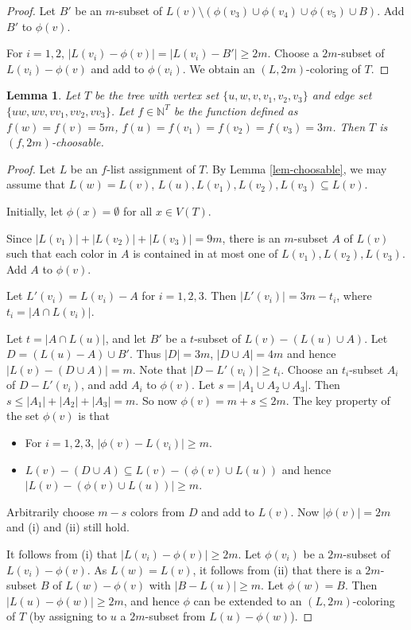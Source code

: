 \documentclass{article}
\newtheorem{lemma}{Lemma}
\begin{document}
\begin{proof}
     Let $B'$ be an $m$-subset of $L(v)\setminus (\phi(v_3)\cup\phi(v_4)\cup \phi(v_5)\cup B)$. Add  $B'$ to $\phi(v)$. 

     For $i=1,2$, $|L(v_i) - \phi(v)| = |L(v_i)-B'| \ge 2m$. Choose a $2m$-subset of $L(v_i) - \phi(v)$ and add to $\phi(v_i)$. We obtain an $(L, 2m)$-coloring of $T$.
\end{proof}


\begin{lemma}
    \label{lem-broom}
    Let $T$ be the tree with vertex set $\{u,w,v, v_1,v_2,v_3\}$ and edge set $\{uw, wv, vv_1,vv_2,vv_3\}$. Let $f \in \mathbb{N}^T$ be the function defined as $f(w)=f(v)=5m$, $f(u) = f(v_1)=f(v_2)=f(v_3)=3m$. Then $T$ is $(f, 2m)$-choosable.
\end{lemma}
\begin{proof}
    Let $L$ be an $f$-list assignment of $T$. By Lemma \ref{lem-choosable}, we may assume that $L(w)=L(v)$, $L(u), L(v_1), L(v_2), L(v_3) \subseteq L(v)$. 

    Initially, let $\phi(x)= \emptyset$ for all $x \in V(T)$.
    
    Since $|L(v_1)|+|L(v_2)|+|L(v_3)| = 9m$, there is an $m$-subset $A$ of $L(v)$ such that each color in $A$ is contained in at most one of $L(v_1), L(v_2), L(v_3)$. 
    Add $A$ to $\phi(v)$.  

    Let $L'(v_i) = L(v_i) - A$ for $i=1,2,3$. Then $|L'(v_i)|=3m-t_i$, where  $t_i = |A \cap L(v_i)| $. 
 
   Let $t= |A \cap L(u)|$, and let $B'$ be a $t$-subset of $L(v) - (L(u) \cup A)$. 
   Let $D= (L(u)-A) \cup B'$. Thus $|D|=3m$, $|D \cup A|=4m$ and hence $|L(v)-(D \cup A)|=m$. 
  Note that $|D-L'(v_i)| \ge t_i$. 
   Choose an $t_i$-subset $A_i$ of $D-L'(v_i)$, and add $A_i$ to $\phi(v)$. Let $s= |A_1 \cup A_2 \cup A_3|$. Then  $ s \le |A_1|+|A_2|+|A_3|=m$. So now $\phi(v) =m+s \le 2m$. The key property of the set $\phi(v)$ is that 
   \begin{itemize}
       \item[(i)] For $i=1,2,3$, $|\phi(v) - L(v_i)| \ge m$.
       \item[(ii)] $L(v)-(D \cup A) \subseteq  L(v)  - (\phi(v)  \cup L(u))$ and hence $|L(v)  - (\phi(v)  \cup L(u))|    \ge m$.
   \end{itemize}
   Arbitrarily choose $m-s$ colors from 
$D$ and add to $L(v)$. Now $|\phi(v)|=2m$ and  (i) and (ii) still hold. 

It follows from (i) that $|L(v_i) - \phi(v)| \ge 2m$. Let $\phi(v_i)$ be a $2m$-subset of $L(v_i) - \phi(v)$. 
As $L(w)=L(v)$, it follows from (ii) that there is a $2m$-subset $B$ of $L(w)-\phi(v)$ with $|B-L(u)| \ge m$. Let $\phi(w)=B$. Then $|L(u)-\phi(w)| \ge 2m$, and hence $\phi$ can be extended to an $(L,2m)$-coloring of $T$ (by assigning to $u$ a $2m$-subset from $L(u)-\phi(w)$). 
\end{proof}
\end{document}
